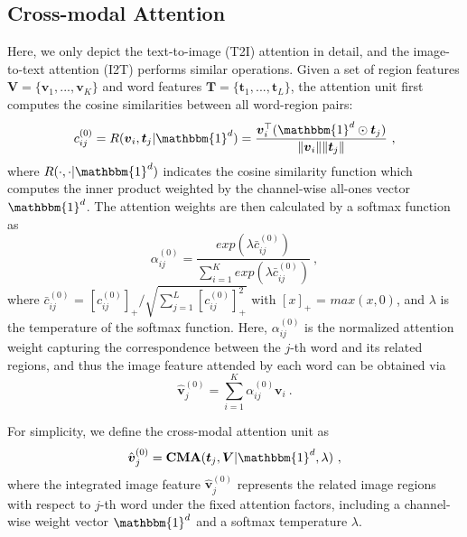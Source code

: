 \documentclass[journal]{IEEEtran}\newcommand{\ignore}[1]{}
\begin{document}
\subsection{Cross-modal Attention}
Here, we only depict the text-to-image (T2I) attention in detail, and the image-to-text attention (I2T) performs similar operations. Given a set of region features $\boldsymbol{V} = \{\boldsymbol{v}_{1},...,\boldsymbol{v}_{K}\}$ and word features $\boldsymbol{T} = \{\boldsymbol{t}_{1},...,\boldsymbol{t}_{L}\}$, the attention unit first computes the cosine similarities between all word-region pairs:
\begin{equation}
\label{eq:cij}
    c_{ij}^{(0)} = R(\boldsymbol{v}_{i}, \boldsymbol{t}_{j}|\mathbbm{1}^{d}) = \frac{\boldsymbol{v}_{i}^{\top}(\mathbbm{1}^{d} \odot \boldsymbol{t}_{j})}{\|\boldsymbol{v}_{i}\|\|\boldsymbol{t}_{j}\|} \ ,
\end{equation}
where $R(\cdot,\cdot|\mathbbm{1}^{d})$ indicates the cosine similarity function which computes the inner product weighted by the channel-wise all-ones vector $\mathbbm{1}^{d}$. The attention weights are then calculated by a softmax function as
\begin{equation}
\label{eq:alphaij}
    \alpha_{ij}^{(0)} = \frac{exp({\lambda}\bar{c}_{ij}^{(0)})}{{\sum}_{i=1}^{K}exp({\lambda}\bar{c}_{ij}^{(0)})} \ ,
\end{equation} 
where $\bar{c}_{ij}^{(0)}$ = ${{\left [ c_{ij}^{(0)} \right ]}_{+}}/{\sqrt{{\sum}_{j=1}^{L}{\left [ c_{ij}^{(0)} \right ]}_{+}^{2}}}$ with $\left [ x \right ]_{+}$ = $max(x, 0)$, and $\lambda$ is the temperature of the softmax function. 
Here, ${\alpha}_{ij}^{(0)}$ is the normalized attention weight capturing the correspondence between the $j$-th word and its related regions, and thus the image feature attended by each word can be obtained via
\begin{equation}
\label{eq:hatvj}
    \hat{\boldsymbol{v}}_{j}^{(0)} = \sum \limits_{i=1}^{K}{\alpha}_{ij}^{(0)}\boldsymbol{v}_{i} \ .
\end{equation}

For simplicity, we define the cross-modal attention unit as
\begin{equation}
\label{eq:cma}
    \hat{\boldsymbol{v}}_j^{(0)} = \mathbf{CMA}(\boldsymbol{t}_j,
    \boldsymbol{V}|\mathbbm{1}^{d},\lambda) \ ,
\end{equation}
where the integrated image feature $\hat{\boldsymbol{v}}_{j}^{(0)}$ represents the related image regions with respect to $j$-th word under the fixed attention factors, including a channel-wise weight vector $\mathbbm{1}^{d}$ and a softmax temperature $\lambda$.
\end{document}
